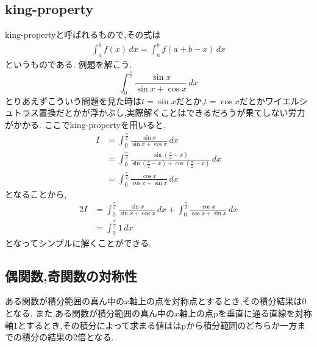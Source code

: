﻿\documentclass[dvipdfmx,a4paper,11pt,fleqn]{jsarticle}
\begin{document}
\subsection{king-property}
  king-propertyと呼ばれるもので,その式は
  \begin{align}
    \int_{a}^{b} f(x)\, dx=\int_{a}^{b} f(a+b-x) \, dx
  \end{align}
というものである.
例題を解こう.
\[
\int_{0}^{\frac{\pi}{2}} \frac{\sin x}{\sin x + \cos x}\, dx
\]
とりあえずこういう問題を見た時は$t=\sin x$だとか,$t=\cos x$だとかワイエルシュトラス置換だとかが浮かぶし,実際解くことはできるだろうが果てしない労力がかかる.
ここでking-propertyを用いると,
\begin{align*}
  I&=\int_{0}^{\frac{\pi}{2}} \frac{\sin x}{\sin x + \cos x}\, dx\\
  &=\int_{0}^{\frac{\pi}{2}} \frac{\sin (\frac{\pi}{2}-x)}{\sin (\frac{\pi}{2}-x) + \cos (\frac{\pi}{2}-x)}\, dx\\
  &=\int_{0}^{\frac{\pi}{2}} \frac{\cos x}{\cos x + \sin x}\, dx
\end{align*}
\hspace{2em}となることから,
\begin{align*}
  2I&=\int_{0}^{\frac{\pi}{2}} \frac{\sin x}{\sin x + \cos x}\, dx+\int_{0}^{\frac{\pi}{2}} \frac{\cos x}{\cos x + \sin x}\, dx\\
  &=\int_{0}^{\frac{\pi}{2}} 1\,dx
\end{align*}
となってシンプルに解くことができる.

\subsection{偶関数,奇関数の対称性}
ある関数が積分範囲の真ん中の$x$軸上の点を対称点とするとき,その積分結果は0となる.
また,ある関数が積分範囲の真ん中の$x$軸上の点pを垂直に通る直線を対称軸1とするとき,その積分によって求まる値ははpから積分範囲のどちらか一方までの積分の結果の2倍となる.
\end{document}
